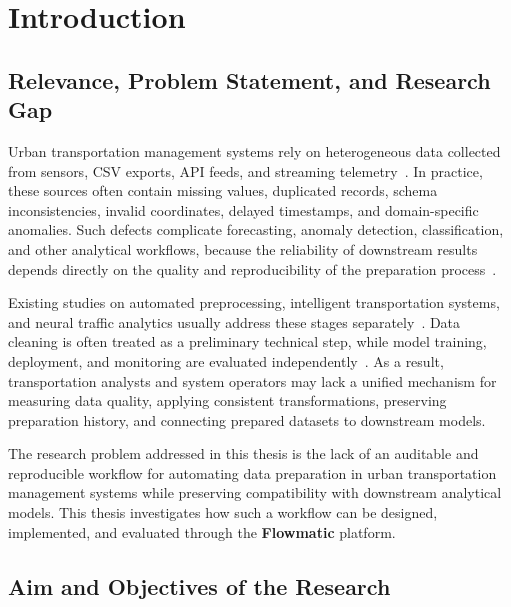 %
%
\chapter{Introduction}
\label{chap:intro}
\setlength{\parskip}{1em}

\section{Relevance, Problem Statement, and Research Gap}

Urban transportation management systems rely on heterogeneous data collected from sensors, CSV exports, API feeds, and streaming telemetry~\cite{wang1996beyond,pipino2002data,zanella2014iot}. In practice, these sources often contain missing values, duplicated records, schema inconsistencies, invalid coordinates, delayed timestamps, and domain-specific anomalies. Such defects complicate forecasting, anomaly detection, classification, and other analytical workflows, because the reliability of downstream results depends directly on the quality and reproducibility of the preparation process~\cite{sculley2015hidden}.

Existing studies on automated preprocessing, intelligent transportation systems, and neural traffic analytics usually address these stages separately~\cite{liu2022automated,feurer2019auto,its_bigdata2018,nie2023patchtst,yu2018stgcn}. Data cleaning is often treated as a preliminary technical step, while model training, deployment, and monitoring are evaluated independently~\cite{zaharia2018accelerating,kreutzberger2022mlops}. As a result, transportation analysts and system operators may lack a unified mechanism for measuring data quality, applying consistent transformations, preserving preparation history, and connecting prepared datasets to downstream models.

The research problem addressed in this thesis is the lack of an auditable and reproducible workflow for automating data preparation in urban transportation management systems while preserving compatibility with downstream analytical models. This thesis investigates how such a workflow can be designed, implemented, and evaluated through the \textbf{Flowmatic} platform.

\section{Aim and Objectives of the Research}
\label{sec:objectives}

